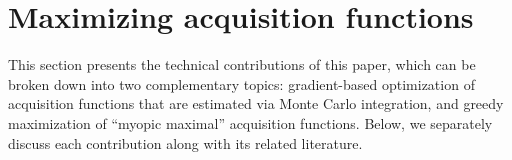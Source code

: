 
\section{Maximizing acquisition functions}
\label{sect:methods}

This section presents the technical contributions of this paper, which can  be broken down into two complementary topics:  gradient-based optimization of acquisition functions that are estimated via Monte Carlo integration, and  greedy maximization of ``myopic maximal'' acquisition functions. Below, we separately discuss each contribution along with its related literature.



% 